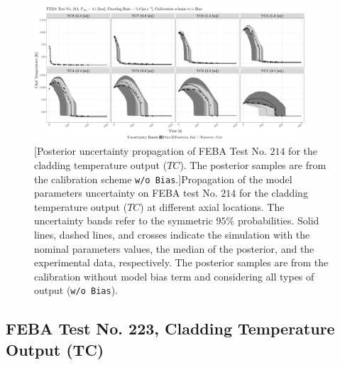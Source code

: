 \clearpage
\begin{figure}
	\centering
	\includegraphics[width=0.90\textwidth]{../figures/chapter5/figures/plotTraceUQPosteriorAllNoDiscNoBCTC214}
		[Posterior uncertainty propagation of FEBA Test No. $214$ for the cladding temperature output ($TC$). The posterior samples are from the calibration scheme \texttt{w/o Bias}.]{Propagation of the model parameters uncertainty on FEBA test No. $214$ for the cladding temperature output ($TC$) at different axial locations. The uncertainty bands refer to the symmetric $95\%$ probabilities. Solid lines, dashed lines, and crosses indicate the simulation with the nominal parameters values, the median of the posterior, and the experimental data, respectively. The posterior samples are from the calibration without model bias term and considering all types of output (\texttt{w/o Bias}).}
	\label{fig:ch5_plot_trace_uq_post_tc_214_nodisc}
\end{figure}
\clearpage

\subsection{FEBA Test No. 223, Cladding Temperature Output (TC)}\label{app:tbl_results_uq_post_tc_223}

